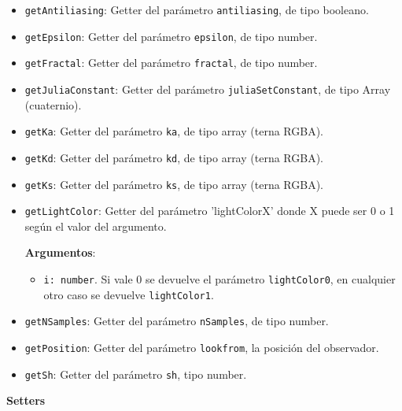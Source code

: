 \begin{itemize}
    \item \verb|getAntiliasing|: Getter del parámetro \verb|antiliasing|, de tipo booleano.
    \item \verb|getEpsilon|: Getter del parámetro \verb|epsilon|, de tipo number.
    \item \verb|getFractal|: Getter del parámetro \verb|fractal|, de tipo number.
    \item \verb|getJuliaConstant|: Getter del parámetro \verb|juliaSetConstant|, de tipo Array (cuaternio).
    \item \verb|getKa|: Getter del parámetro \verb|ka|, de tipo array (terna RGBA).
    \item \verb|getKd|: Getter del parámetro \verb|kd|, de tipo array (terna RGBA).
    \item \verb|getKs|: Getter del parámetro \verb|ks|, de tipo array (terna RGBA).
    \item \verb|getLightColor|: Getter del parámetro 'lightColorX' donde X puede ser 0 o 1 según el valor del argumento.
    
    \textbf{Argumentos}:
    \begin{itemize}
        \item \verb|i: number|. Si vale 0 se devuelve el parámetro \verb|lightColor0|, en cualquier otro caso se devuelve \verb|lightColor1|.
    \end{itemize}
    \item \verb|getNSamples|: Getter del parámetro \verb|nSamples|, de tipo number.
    \item \verb|getPosition|: Getter del parámetro \verb|lookfrom|, la posición del observador.
    \item \verb|getSh|: Getter del parámetro \verb|sh|, tipo number.
\end{itemize}
\textbf{Setters}
